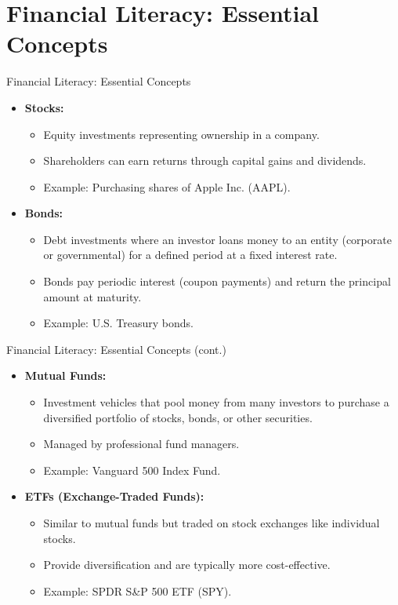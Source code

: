 \documentclass{beamer}
\begin{document}
\section{Financial Literacy: Essential Concepts}
\begin{frame}{Financial Literacy: Essential Concepts}
        \begin{itemize}
            \item \textbf{Stocks:}
            \begin{itemize}
                \item Equity investments representing ownership in a company.
                \item Shareholders can earn returns through capital gains and dividends.
                \item Example: Purchasing shares of Apple Inc. (AAPL).
            \end{itemize}
            \item \textbf{Bonds:}
            \begin{itemize}
                \item Debt investments where an investor loans money to an entity (corporate or governmental) for a defined period at a fixed interest rate.
                \item Bonds pay periodic interest (coupon payments) and return the principal amount at maturity.
                \item Example: U.S. Treasury bonds.
            \end{itemize}
        \end{itemize}
\end{frame}

            
            
\begin{frame}{Financial Literacy: Essential Concepts (cont.)}
        \begin{itemize}
            \item \textbf{Mutual Funds:}
            \begin{itemize}
                \item Investment vehicles that pool money from many investors to purchase a diversified portfolio of stocks, bonds, or other securities.
                \item Managed by professional fund managers.
                \item Example: Vanguard 500 Index Fund.
            \end{itemize}
            \item \textbf{ETFs (Exchange-Traded Funds):}
            \begin{itemize}
                \item Similar to mutual funds but traded on stock exchanges like individual stocks.
                \item Provide diversification and are typically more cost-effective.
                \item Example: SPDR S&P 500 ETF (SPY).
            \end{itemize}
        \end{itemize}
\end{frame}
\end{document}
